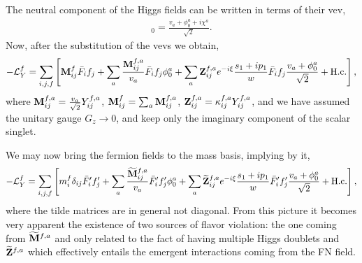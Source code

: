 \documentclass[aps,prd,groupaddress,floatfix,tighten,nofootinbib,showpacs,
amsfonts,superscriptaddress]{revtex4}
\begin{document}
	The neutral component of the 
	Higgs fields can be written in {terms} of their vev,
	\begin{eqnarray}
		[\Phi_a]_0 = \frac{v_a + \phi_0^a + i\chi^a}{\sqrt{2}}.
	\end{eqnarray}
	Now,	after {the} substitution of the vevs we obtain,
	\begin{eqnarray}
		-{\cal L}_Y^f = \sum_{i,j,f} \left[ {\bf M}^f_{ij} 
		\bar{F}_{i} f_j  +  \sum_a \frac{{\bf M}^{f,a}_{ij}}{v_a} \bar{F}_{i} f_j \phi_0^a 
		+ \sum_a {\bf Z}_{ij}^{f,a} e^{-i\xi }\frac{s_1+ip_1}{w} \bar{F}_{i} f_j \frac{v_a + \phi_0^a}{\sqrt{2}}
		+  {\textrm{H.c.}} \right],
	\end{eqnarray}	
	where ${\bf M}_{ij}^{f,a} = \frac{v_a}{\sqrt{2}} Y_{ij}^{f,a}$, ${\bf M}_{ij}^f = \sum_a {\bf M}_{ij}^{f,a} $, ${\bf Z}_{ij}^{f,a} = \kappa_{ij}^{f,a} {Y}_{ij}^{f,a}$,
	and we have assumed the unitary gauge $G_z \rightarrow 0$, 
	and keep only the imaginary component of the
	scalar singlet. 
	
	We may now bring the fermion fields to the mass basis, implying by it,
	\begin{eqnarray}
		-{\cal L}_Y^f = \sum_{i,j,f} \left[ m^f_i \delta_{ij}
		\bar{F}'_{i} f'_j  +  \sum_a \frac{\widetilde{\bf M}^{f,a}_{ij}}{v_a} \bar{F}'_{i} f'_j \phi_0^a 
		+ \sum_a \widetilde{\bf Z}_{ij}^{f,a} e^{-i\xi }\frac{s_1+ip_1}{w} \bar{F}'_{i} f'_j \frac{v_a + \phi_0^a}{\sqrt{2}}
		+  {\textrm{H.c.}} \right],
	\end{eqnarray}
	where the tilde matrices are in general not diagonal. From this picture it becomes very
	apparent the existence of two sources of flavor violation: the one coming from 
	$\widetilde{\bf M}^{f,a}$ and only related to the fact of having multiple Higgs doublets and
	$\widetilde{\bf Z}^{f,a}$ which effectively entails the emergent interactions coming from
	the FN field. 
	
\end{document}
